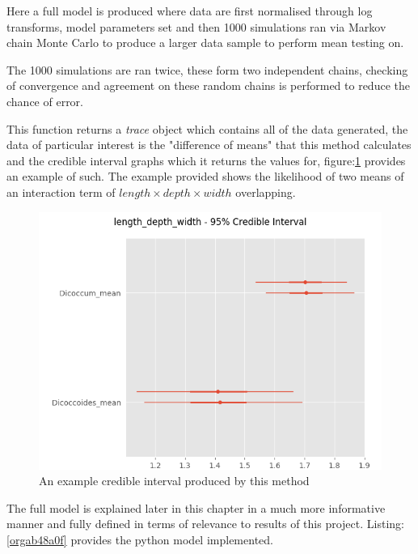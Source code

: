 \documentclass[11pt]{report}
\begin{document}
Here a full model is produced where data are first normalised through log transforms, model parameters set and then 1000 simulations ran via Markov chain Monte Carlo to produce a larger data sample to perform mean testing on.

The 1000 simulations are ran twice, these form two independent chains, checking of convergence and agreement on these random chains is performed to reduce the chance of error.

This function returns a \emph{trace} object which contains all of the data generated, the data of particular interest is the "difference of means" that this method calculates and the credible interval graphs which it returns the values for, figure:\ref{fig:org9780b94} provides an example of such. The example provided shows the likelihood of two means of an interaction term of
\(length \times  depth \times width\) overlapping.

\begin{figure}[htbp]
\centering
\includegraphics[width=15cm]{./images/ci.png}
\caption{\label{fig:org9780b94}
An example credible interval produced by this method}
\end{figure}


The full model is explained later in this chapter in a much more informative manner and fully defined in terms of relevance to results of this project. Listing:\ref{orgab48a0f} provides the python model implemented.
\end{document}

